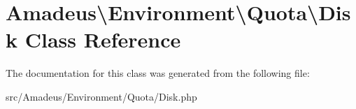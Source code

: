 \hypertarget{classAmadeus_1_1Environment_1_1Quota_1_1Disk}{}\section{Amadeus\textbackslash{}Environment\textbackslash{}Quota\textbackslash{}Disk Class Reference}
\label{classAmadeus_1_1Environment_1_1Quota_1_1Disk}


The documentation for this class was generated from the following file\+:\begin{DoxyCompactItemize}
\item 
src/\+Amadeus/\+Environment/\+Quota/Disk.\+php\end{DoxyCompactItemize}
